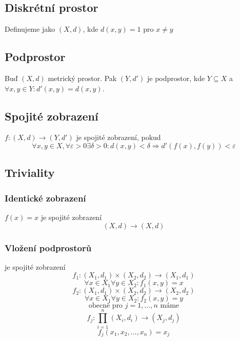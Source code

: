 \documentclass[../main.tex]{subfiles}
\begin{document}
\subsection{Diskrétní prostor}
\hspace{1.2mm}
Definujeme jako $(X,d)$, kde $d(x,y) = 1$ pro $x \neq y$
\noindent

\subsection{Podprostor}
\hspace{1.2mm}
Buď $(X, d)$ metrický prostor. Pak $(Y, d')$ je podprostor, kde $Y \subseteq X$ a $\forall x,y \in Y : d'(x,y) = d(x,y)$.

\subsection{Spojité zobrazení}
\hspace{1.2mm}
$f \colon (X,d) \to (Y, d')$ je spojité zobrazení, pokud
\[ \forall x, y \in X, \forall \varepsilon > 0 \exists \delta > 0:
d(x,y) < \delta \Rightarrow d'(f(x), f(y)) < \varepsilon \]

\subsection{Triviality}
\subsubsection{Identické zobrazení}
$f(x) = x$ je spojité zobrazení
\hspace{1.2mm}
\[ (X,d) \to (X,d) \]

\subsubsection{Vložení podprostorů}
je spojité zobrazení
\hspace{1.2mm}
\[ f_1\colon (X_1,d_1)\times(X_2,d_2) \rightarrow (X_1,d_1) \]
\[\forall x\in X_1 \forall y \in X_2 : f_1(x,y) = x\]
\[f_2 \colon (X_1,d_1)\times(X_2,d_2) \rightarrow (X_2,d_2)\]
\[\forall x\in X_1 \forall y \in X_2 : f_2(x,y) = y\]
\[\text{obecně pro } j=1,...,n \text{ máme}\]
\[f_j\colon\prod^n_{i=1}(X_i,d_i)\rightarrow(X_j,d_j)\]
\[f_j(x_1,x_2,...,x_n) = x_j\]
\end{document}
